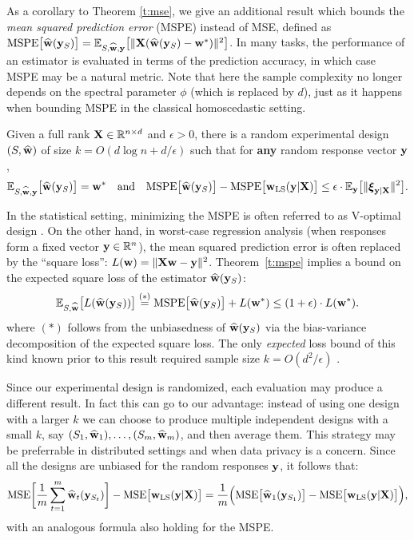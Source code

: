 \documentclass[12pt]{sty/colt2019/colt2018-arxiv}
\begin{document}
As a corollary to Theorem \ref{t:mse}, we give an additional result
which bounds the \textit{mean squared prediction error} (MSPE) instead
of MSE, defined as   $\text{MSPE}\big[\widehat{\mathbf w}(\mathbf y_S)\big] =
\mathbb E_{S,\widehat{\mathbf w},\mathbf y}\big[\|\mathbf X(\widehat{\mathbf w}(\mathbf y_S)-\mathbf w^*)\|^2\big]$.
In many tasks, the 
performance of an estimator is evaluated 
in terms of the prediction accuracy, in which case MSPE may be a
natural metric. Note that here the sample complexity no longer depends
on the spectral parameter $\phi$ (which is replaced by $d$), just as
it happens when bounding MSPE in the classical homoscedastic setting.
\begin{theorem}\label{t:mspe}
Given a full rank $\mathbf X\in\mathbb R^{n\times d}$ and $\epsilon>0$, there is a
random experimental design $(S,\widehat{\mathbf w})$
of size $k=O(d\log n+d/\epsilon)$ such that for \textbf{any} random
response vector $\mathbf y$, 
  \begin{align*}
    \mathbb E_{S,\widehat{\mathbf w},\mathbf y}\big[\widehat{\mathbf w}(\mathbf y_S)\big] = \mathbf w^*\quad\text{and}\quad
    \mathrm{MSPE}\big[\widehat{\mathbf w}(\mathbf y_S)\big]-\mathrm{MSPE}\big[\mathbf w_{\mathrm{LS}}(\mathbf y|\mathbf X)\big]\leq
    \epsilon\cdot\mathbb E_\mathbf y\big[\|\boldsymbol\xi_{\mathbf y|\mathbf X}\|^2\big].
  \end{align*}
\end{theorem}
In the statistical setting, minimizing the MSPE is often referred to
as V-optimal design \citep[see][]{v-optimal}.
On the other hand, in worst-case regression analysis (when responses
form a fixed vector $\mathbf y\in\mathbb R^n$), the mean squared prediction error is
often replaced by the ``square loss'': $L(\mathbf w) =
\|\mathbf X\mathbf w-\mathbf y\|^2$. Theorem~\ref{t:mspe} implies a bound on the expected
square loss of the estimator $\widehat{\mathbf w}(\mathbf y_S)$:
\begin{align}
    \mathbb E_{S,\widehat{\mathbf w}}\big[L(\widehat{\mathbf w}(\mathbf y_S))\big] \overset{(*)}{=} {\mathrm{MSPE}\big[\widehat{\mathbf w}(\mathbf y_S)\big]}+L(\mathbf w^*) \leq
(1+\epsilon)\cdot L(\mathbf w^*).
    \label{e:regret}
\end{align}
where $(*)$ follows from the unbiasedness of $\widehat{\mathbf w}(\mathbf y_S)$ via the
bias-variance decomposition of the expected square loss.
The only
\textit{expected} loss bound of this kind known prior to this result
required sample size $k=O(d^2/\epsilon)$ \citep{unbiased-estimates}. 

Since our experimental design is randomized, each evaluation may
produce a different result. In fact this can go to our advantage:
instead of using one design with a larger $k$ we can choose to produce
multiple independent designs with a small $k$, say
$(S_1,\widehat{\mathbf w}_1),\dots,(S_m,\widehat{\mathbf w}_m)$, and then average them. This
strategy may be preferrable in distributed settings and when data
privacy is a concern. Since all the
designs are unbiased for the random responses $\mathbf y$, it follows that:
\begin{align*}
  \mathrm{MSE}\bigg[\frac1m\sum_{t=1}^m\widehat{\mathbf w}_t(\mathbf y_{S_t})\bigg] -
  \mathrm{MSE}\big[\mathbf w_{\mathrm{LS}}(\mathbf y|\mathbf X)\big] = 
\frac1m\Big(\mathrm{MSE}\big[\widehat{\mathbf w}_1(\mathbf y_{S_1})\big] - \mathrm{MSE}\big[\mathbf w_{\mathrm{LS}}(\mathbf y|\mathbf X)\big]\Big),
\end{align*}
with an analogous formula also holding for the MSPE.
\end{document}

